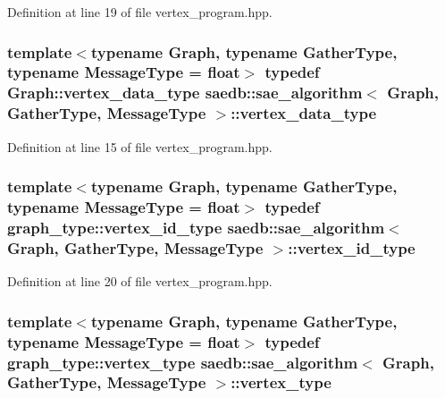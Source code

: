 Definition at line 19 of file vertex\-\_\-program.\-hpp.

\hypertarget{classsaedb_1_1sae__algorithm_a709b55d6063cfd2c5f0dcdb17d6d5258}{
\subsubsection[{vertex\-\_\-data\-\_\-type}]{\setlength{\rightskip}{0pt plus 5cm}template$<$typename Graph, typename Gather\-Type, typename Message\-Type = float$>$ typedef Graph\-::vertex\-\_\-data\-\_\-type {\bf saedb\-::sae\-\_\-algorithm}$<$ Graph, Gather\-Type, Message\-Type $>$\-::{\bf vertex\-\_\-data\-\_\-type}}}\label{d0/d9f/classsaedb_1_1sae__algorithm_a709b55d6063cfd2c5f0dcdb17d6d5258}


Definition at line 15 of file vertex\-\_\-program.\-hpp.

\hypertarget{classsaedb_1_1sae__algorithm_a943e87163aee5f148d7a7c68be72b123}{
\subsubsection[{vertex\-\_\-id\-\_\-type}]{\setlength{\rightskip}{0pt plus 5cm}template$<$typename Graph, typename Gather\-Type, typename Message\-Type = float$>$ typedef {\bf graph\-\_\-type\-::vertex\-\_\-id\-\_\-type} {\bf saedb\-::sae\-\_\-algorithm}$<$ Graph, Gather\-Type, Message\-Type $>$\-::{\bf vertex\-\_\-id\-\_\-type}}}\label{d0/d9f/classsaedb_1_1sae__algorithm_a943e87163aee5f148d7a7c68be72b123}


Definition at line 20 of file vertex\-\_\-program.\-hpp.

\hypertarget{classsaedb_1_1sae__algorithm_ae26abf349aed2b0c9f82e1396b78561a}{
\subsubsection[{vertex\-\_\-type}]{\setlength{\rightskip}{0pt plus 5cm}template$<$typename Graph, typename Gather\-Type, typename Message\-Type = float$>$ typedef {\bf graph\-\_\-type\-::vertex\-\_\-type} {\bf saedb\-::sae\-\_\-algorithm}$<$ Graph, Gather\-Type, Message\-Type $>$\-::{\bf vertex\-\_\-type}}}\label{d0/d9f/classsaedb_1_1sae__algorithm_ae26abf349aed2b0c9f82e1396b78561a}



